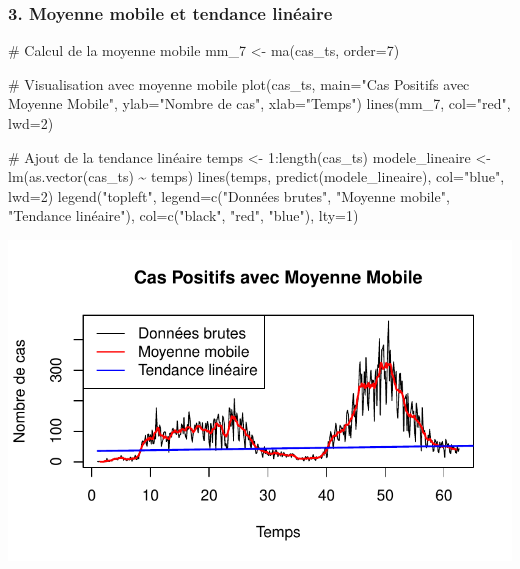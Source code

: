 \documentclass[
  letterpaper,
  DIV=11,
  numbers=noendperiod]{scrartcl}
\newenvironment{Shaded}{\begin{snugshade}}{\end{snugshade}}
\newcommand{\AttributeTok}[1]{\textcolor[rgb]{0.40,0.45,0.13}{#1}}
\newcommand{\CommentTok}[1]{\textcolor[rgb]{0.37,0.37,0.37}{#1}}
\newcommand{\DecValTok}[1]{\textcolor[rgb]{0.68,0.00,0.00}{#1}}
\newcommand{\FunctionTok}[1]{\textcolor[rgb]{0.28,0.35,0.67}{#1}}
\newcommand{\NormalTok}[1]{\textcolor[rgb]{0.00,0.23,0.31}{#1}}
\newcommand{\OtherTok}[1]{\textcolor[rgb]{0.00,0.23,0.31}{#1}}
\newcommand{\SpecialCharTok}[1]{\textcolor[rgb]{0.37,0.37,0.37}{#1}}
\newcommand{\StringTok}[1]{\textcolor[rgb]{0.13,0.47,0.30}{#1}}
\begin{document}
\subsubsection{3. Moyenne mobile et tendance
linéaire}\label{moyenne-mobile-et-tendance-linuxe9aire}

\begin{Shaded}
\begin{Highlighting}[]
\CommentTok{\# Calcul de la moyenne mobile}
\NormalTok{mm\_7 }\OtherTok{\textless{}{-}} \FunctionTok{ma}\NormalTok{(cas\_ts, }\AttributeTok{order=}\DecValTok{7}\NormalTok{)}

\CommentTok{\# Visualisation avec moyenne mobile}
\FunctionTok{plot}\NormalTok{(cas\_ts, }\AttributeTok{main=}\StringTok{"Cas Positifs avec Moyenne Mobile"}\NormalTok{, }
     \AttributeTok{ylab=}\StringTok{"Nombre de cas"}\NormalTok{, }\AttributeTok{xlab=}\StringTok{"Temps"}\NormalTok{)}
\FunctionTok{lines}\NormalTok{(mm\_7, }\AttributeTok{col=}\StringTok{"red"}\NormalTok{, }\AttributeTok{lwd=}\DecValTok{2}\NormalTok{)}

\CommentTok{\# Ajout de la tendance linéaire}
\NormalTok{temps }\OtherTok{\textless{}{-}} \DecValTok{1}\SpecialCharTok{:}\FunctionTok{length}\NormalTok{(cas\_ts)}
\NormalTok{modele\_lineaire }\OtherTok{\textless{}{-}} \FunctionTok{lm}\NormalTok{(}\FunctionTok{as.vector}\NormalTok{(cas\_ts) }\SpecialCharTok{\textasciitilde{}}\NormalTok{ temps)}
\FunctionTok{lines}\NormalTok{(temps, }\FunctionTok{predict}\NormalTok{(modele\_lineaire), }\AttributeTok{col=}\StringTok{"blue"}\NormalTok{, }\AttributeTok{lwd=}\DecValTok{2}\NormalTok{)}
\FunctionTok{legend}\NormalTok{(}\StringTok{"topleft"}\NormalTok{, }\AttributeTok{legend=}\FunctionTok{c}\NormalTok{(}\StringTok{"Données brutes"}\NormalTok{, }\StringTok{"Moyenne mobile"}\NormalTok{, }\StringTok{"Tendance linéaire"}\NormalTok{), }
       \AttributeTok{col=}\FunctionTok{c}\NormalTok{(}\StringTok{"black"}\NormalTok{, }\StringTok{"red"}\NormalTok{, }\StringTok{"blue"}\NormalTok{), }\AttributeTok{lty=}\DecValTok{1}\NormalTok{)}
\end{Highlighting}
\end{Shaded}

\includegraphics{TS_files/figure-pdf/unnamed-chunk-3-1.pdf}
\end{document}

